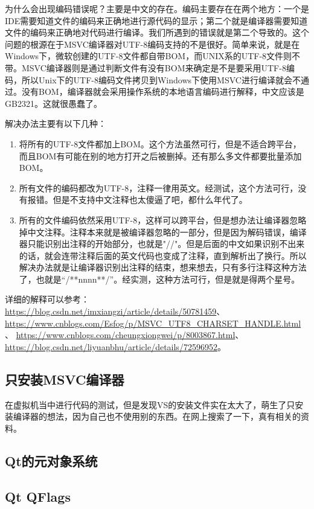 为什么会出现编码错误呢？主要是中文的存在。编码主要存在在两个地方：一个是IDE需要知道文件的编码来正确地进行源代码的显示；第二个就是编译器需要知道文件的编码来正确地对代码进行编译。我们所遇到的错误就是第二个导致的。这个问题的根源在于MSVC编译器对UTF-8编码支持的不是很好。简单来说，就是在Windows下，微软创建的UTF-8文件都自带BOM，而UNIX系的UTF-8文件则不带。MSVC编译器则是通过判断文件有没有BOM来确定是不是要采用UTF-8编码，所以Unix下的UTF-8编码文件拷贝到Windows下使用MSVC进行编译就会不通过。没有BOM，编译器就会采用操作系统的本地语言编码进行解释，中文应该是GB2321。这就很愚蠢了。

解决办法主要有以下几种：
\begin{enumerate}
	\item 将所有的UTF-8文件都加上BOM。这个方法虽然可行，但是不适合跨平台，而且BOM有可能在别的地方打开之后被删掉。还有那么多文件都要批量添加BOM。
	\item 所有文件的编码都改为UTF-8，注释一律用英文。经测试，这个方法可行，没有报错。但是不支持中文注释也太傻逼了吧，都什么年代了。
	\item 所有的文件编码依然采用UTF-8，这样可以跨平台，但是想办法让编译器忽略掉中文注释。注释本来就是被编译器忽略的一部分，但是因为解码错误，编译器只能识别出注释的开始部分，也就是"//"。但是后面的中文如果识别不出来的话，就会连带注释后面的英文代码也变成了注释，直到解析出了换行。所以解决办法就是让编译器识别出注释的结束，想来想去，只有多行注释这种方法了，也就是“/**nnnn**/”。经实测，这种方法可行，但是就是得两个星号。
\end{enumerate}

详细的解释可以参考：\url{https://blog.csdn.net/imxiangzi/article/details/50781459}、 \url{https://www.cnblogs.com/Esfog/p/MSVC_UTF8_CHARSET_HANDLE.html}、 \url{https://www.cnblogs.com/cheungxiongwei/p/8003867.html}、 \url{https://blog.csdn.net/liyuanbhu/article/details/72596952}。

\subsection{只安装MSVC编译器}
在虚拟机当中进行代码的测试，但是发现VS的安装文件实在太大了，萌生了只安装编译器的想法，因为自己也不使用别的东西。在网上搜索了一下，真有相关的资料。

\subsection{Qt的元对象系统}

\subsection{Qt QFlags}


